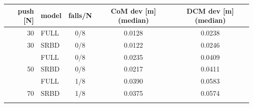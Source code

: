 \begin{tabular}{rlccc}
\toprule
push [N] & model & falls/N & CoM dev [m] (median) & DCM dev [m] (median) \\
\midrule
30 & FULL & 0/8 & 0.0128 & 0.0238 \\
30 & SRBD & 0/8 & 0.0122 & 0.0246 \\
\addlinespace
50 & FULL & 0/8 & 0.0235 & 0.0409 \\
50 & SRBD & 0/8 & 0.0217 & 0.0411 \\
\addlinespace
70 & FULL & 1/8 & 0.0390 & 0.0583 \\
70 & SRBD & 1/8 & 0.0375 & 0.0574 \\
\addlinespace
\bottomrule
\end{tabular}
